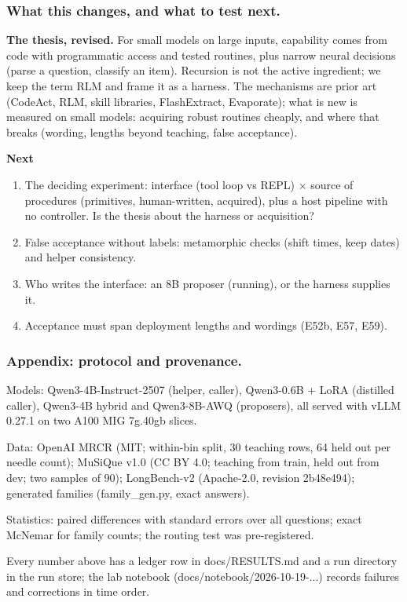 \documentclass[aspectratio=169,11pt]{beamer}
\begin{document}
\begin{frame}[t]
\frametitle{What this changes, and what to test next.}
\small
\textbf{The thesis, revised.} For small models on large inputs, capability comes from code with programmatic access
and tested routines, plus narrow neural decisions (parse a question, classify an item). Recursion is not the active
ingredient; we keep the term RLM and frame it as a harness. The mechanisms are prior art (CodeAct, RLM,
skill libraries, FlashExtract, Evaporate); what is new is measured on small models: \alert{acquiring} robust routines
cheaply, and where that breaks (wording, lengths beyond teaching, false acceptance).\par\medskip
\textbf{Next}
\begin{enumerate}\setlength\itemsep{1mm}
\item The deciding experiment: interface (tool loop vs REPL) $\times$ source of procedures (primitives,
human-written, acquired), plus a host pipeline with no controller. Is the thesis about the harness or acquisition?
\item False acceptance without labels: metamorphic checks (shift times, keep dates) and helper consistency.
\item Who writes the interface: an 8B proposer (running), or the harness supplies it.
\item Acceptance must span deployment lengths and wordings (E52b, E57, E59).
\end{enumerate}
\end{frame}

\begin{frame}[t]
\frametitle{Appendix: protocol and provenance.}
\footnotesize
Models: Qwen3-4B-Instruct-2507 (helper, caller), Qwen3-0.6B + LoRA (distilled caller), Qwen3-4B hybrid and
Qwen3-8B-AWQ (proposers), all served with vLLM 0.27.1 on two A100 MIG 7g.40gb slices.\par\smallskip
Data: OpenAI MRCR (MIT; within-bin split, 30 teaching rows, 64 held out per needle count); MuSiQue v1.0 (CC BY
4.0; teaching from train, held out from dev; two samples of 90); LongBench-v2 (Apache-2.0, revision 2b48e494);
generated families (family\_gen.py, exact answers).\par\smallskip
Statistics: paired differences with standard errors over all questions; exact McNemar for family counts;
the routing test was pre-registered.\par\smallskip
Every number above has a ledger row in docs/RESULTS.md and a run directory in the run store; the lab notebook
(docs/notebook/2026-10-19-...) records failures and corrections in time order.
\end{frame}
\end{document}
